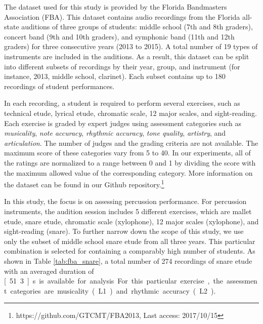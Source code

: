 \documentclass{ws-ijsc}
\begin{document}


The dataset used for this study is provided by the Florida Bandmasters Association (FBA). This dataset contains audio recordings from the Florida all-state auditions of three groups of students: middle school (7th and 8th graders), concert band (9th and 10th graders), and symphonic band (11th and 12th graders) for three consecutive years (2013 to 2015). A total number of 19 types of instruments are included in the auditions. As a result, this dataset can be split into different subsets of recordings by their year, group, and instrument (for instance, 2013, middle school, clarinet). Each subset contains up to 180 recordings of student performances.  

In each recording, a student is required to perform several exercises, such as technical etude, lyrical etude, chromatic scale, 12 major scales, and sight-reading. Each exercise is graded by expert judges using assessment categories such as \textit{musicality}, \textit{note accuracy}, \textit{rhythmic accuracy}, \textit{tone quality}, \textit{artistry}, and \textit{articulation}. The number of judges and the grading criteria are not available. The maximum score of these categories vary from 5 to 40. In our experiments, all of the ratings are normalized to a range between 0 and 1 by dividing the score with the maximum allowed value of the corresponding category. %
More information on the dataset can be found in our Github repository.\footnote{https://github.com/GTCMT/FBA2013, Last access: 2017/10/15}%

In this study, the focus is on assessing percussion performance. For percussion instruments, the audition session includes 5 different exercises, which are mallet etude, snare etude, chromatic scale (xylophone), 12 major scales (xylophone), and sight-reading (snare). To further narrow down the scope of this study, we use only the subset of middle school snare etude from all three years. This particular combination is selected for containing a comparably high number of students. As shown in Table \ref{tab:fba_snare}, a total number of 274 recordings of snare etude with an averaged duration of \unit[51.3]{s} is available for analysis. For this particular exercise, the assessment categories are musicality (L1) and rhythmic accuracy (L2).
\end{document}
